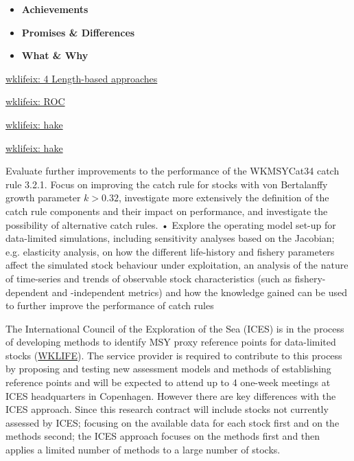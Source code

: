\begin{itemize}[labelindent=\parindent,noitemsep,topsep=0pt,parsep=0pt,partopsep=0pt]
 \item \textbf{Achievements}
 \item \textbf{Promises \& Differences}
 \item \textbf{What \& Why}
\end{itemize}

\href{http://ices.dk/sites/pub/Publication Reports/Expert Group Report/Fisheries Resources Steering Group/2019/WKLIFEIX/WKLIFE_IX_2019.pdf#page=30}{wklifeix: 4 Length-based approaches}

\href{http://ices.dk/sites/pub/Publication Reports/Expert Group Report/Fisheries Resources Steering Group/2019/WKLIFEIX/WKLIFE_IX_2019.pdf#page=58)}{wklifeix: ROC}

\href{http://ices.dk/sites/pub/Publication Reports/Expert Group Report/Fisheries Resources Steering Group/2019/WKLIFEIX/WKLIFE_IX_2019.pdf#page=100}{wklifeix: hake}

\href{http://ices.dk/sites/pub/Publication Reports/Expert Group Report/Fisheries Resources Steering Group/2019/WKLIFEIX/WKLIFE_IX_2019.pdf#page=101}{wklifeix: hake}

Evaluate further improvements to the performance of the WKMSYCat34 catch rule 3.2.1.
Focus on improving the catch rule for stocks with von Bertalanffy growth parameter
$k>0.32$, investigate more extensively the definition of the catch rule components and their
impact on performance, and investigate the possibility of alternative catch rules.
• Explore the operating model set-up for data-limited simulations, including sensitivity
analyses based on the Jacobian; e.g. elasticity analysis, on how the different life-history
and fishery parameters affect the simulated stock behaviour under exploitation, an analysis of the nature of time-series and trends of observable stock characteristics (such as
fishery-dependent and -independent metrics) and how the knowledge gained can be
used to further improve the performance of catch rules

  \*\*The International Council of the Exploration of the Sea (ICES)\*\* is in the process of developing methods to identify MSY proxy reference points for data-limited stocks (\href{http://ices.dk/sites/pub/Publication Reports/Expert Group Report/Fisheries Resources Steering Group/2019/WKLIFEIX/WKLIFE_IX_2019.pdf}{WKLIFE}). The service provider is required to contribute to this process by proposing and testing new assessment models and methods of establishing reference points and will be expected to attend up to 4 one-week meetings at ICES headquarters in Copenhagen. However there are key differences with the ICES approach. Since this research contract will include stocks not currently assessed by ICES; focusing on the available data for each stock first and on the methods second; the ICES approach focuses on the methods first and then applies a limited number of methods to a large number of stocks.
